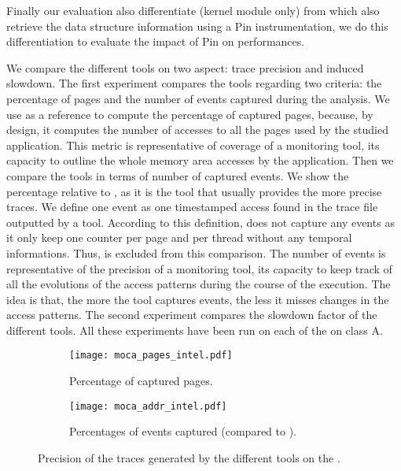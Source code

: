 Finally our evaluation also differentiate \Moca (kernel module only) from
\MocaPin which also retrieve the data structure information using a Pin
instrumentation, we do this differentiation to evaluate the impact of Pin on
\Moca performances.

We compare the different tools on two aspect: trace precision and induced slowdown. The first experiment compares the tools regarding two criteria:  the
percentage of pages and the number of events captured during the analysis.  We use \TABARNAC as a reference to compute the percentage of captured pages,
because, by design, it computes the number of accesses to all the pages used by the studied application. This metric is representative of coverage of a
monitoring tool, its capacity to outline the whole memory area accesses by the application. Then we compare the tools in terms of number of
captured events.  We show the percentage relative to \Moca, as it is the tool that usually provides the more precise traces. We define one event as one
timestamped access found in the trace file outputted by a tool. According to this definition, \TABARNAC does not capture any events as it only keep one
counter per page and per thread without any temporal informations. Thus, \TABARNAC is excluded from this comparison. The number of events is representative
of the precision of a monitoring tool, its capacity to keep track of all the evolutions of the access patterns during the course of the execution. The idea is
that, the more the tool captures events, the less it misses changes in the access patterns.
The second experiment compares the
slowdown factor of the different tools.  All these experiments have been run on each of the \NPB on class A.

\begin{figure}[htb]
    \centering
    \begin{subfigure}{\linewidth}
        \texttt{[image: moca\_pages\_intel.pdf]}
        \caption{Percentage of captured pages.}
        \label{fig:pages}
    \end{subfigure}
    \begin{subfigure}{\linewidth}
        \texttt{[image: moca\_addr\_intel.pdf]}
        \caption{Percentages of events captured (compared to \Moca).}
        \label{fig:addr}
    \end{subfigure}
    \caption{Precision of the traces generated by the different tools on the \NPB.}
    \label{fig:pages-addr}
\end{figure}

